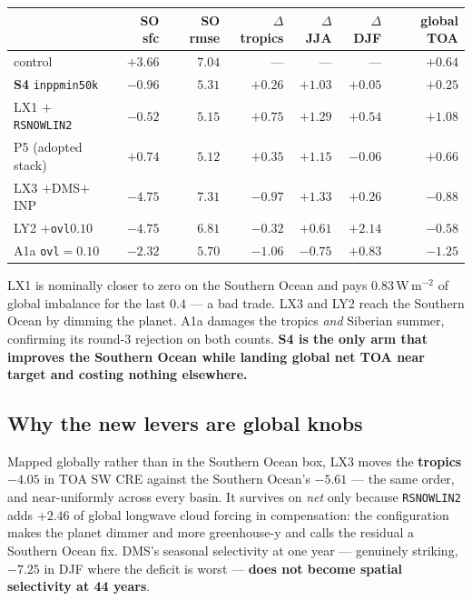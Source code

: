 \documentclass[10pt]{article}
\begin{document}
\begin{center}\footnotesize
\begin{tabular}{l r r r r r r}
\toprule
& SO sfc & SO rmse & $\Delta$tropics & $\Delta$JJA & $\Delta$DJF & global TOA \\
\midrule
control & $+3.66$ & $7.04$ & --- & --- & --- & $+0.64$ \\
\textbf{S4} \texttt{inppmin50k} & $\mathbf{-0.96}$ & $5.31$ & $+0.26$ & $+1.03$ & $+0.05$ & $\mathbf{+0.25}$ \\
LX1 $+$\texttt{RSNOWLIN2} & $-0.52$ & $5.15$ & $+0.75$ & $+1.29$ & $+0.54$ & $+1.08$ \\
P5 (adopted stack) & $+0.74$ & $5.12$ & $+0.35$ & $+1.15$ & $-0.06$ & $+0.66$ \\
LX3 $+$DMS$+$INP & $-4.75$ & $7.31$ & $-0.97$ & $+1.33$ & $+0.26$ & $-0.88$ \\
LY2 $+$\texttt{ovl}$0.10$ & $-4.75$ & $6.81$ & $-0.32$ & $+0.61$ & $+2.14$ & $-0.58$ \\
A1a \texttt{ovl}$=0.10$ & $-2.32$ & $5.70$ & $-1.06$ & $-0.75$ & $+0.83$ & $-1.25$ \\
\bottomrule
\end{tabular}
\end{center}

LX1 is nominally closer to zero on the Southern Ocean and pays $0.83$\,W\,m$^{-2}$ of
global imbalance for the last $0.4$ --- a bad trade. LX3 and LY2 reach the Southern Ocean
by dimming the planet. A1a damages the tropics \emph{and} Siberian summer, confirming its
round-3 rejection on both counts. \textbf{S4 is the only arm that improves the Southern
Ocean while landing global net TOA near target and costing nothing elsewhere.}

\subsection{Why the new levers are global knobs}
Mapped globally rather than in the Southern Ocean box, LX3 moves the \textbf{tropics
$-4.05$} in TOA SW CRE against the Southern Ocean's $-5.61$ --- the same order, and
near-uniformly across every basin. It survives on \emph{net} only because
\texttt{RSNOWLIN2} adds $+2.46$ of global longwave cloud forcing in compensation: the
configuration makes the planet dimmer and more greenhouse-y and calls the residual a
Southern Ocean fix. DMS's seasonal selectivity at one year --- genuinely striking, $-7.25$
in DJF where the deficit is worst --- \textbf{does not become spatial selectivity at 44
years}.
\end{document}
